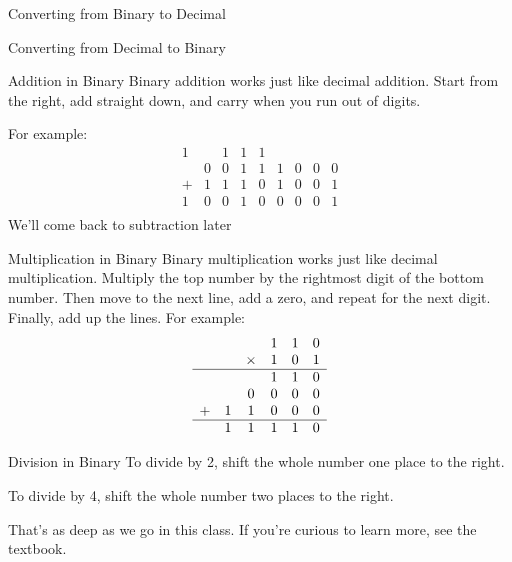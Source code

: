 \begin{frame}{Converting from Binary to Decimal}
\end{frame}

\begin{frame}{Converting from Decimal to Binary}
\end{frame}

\begin{frame}{Addition in Binary}
Binary addition works just like decimal addition. 
Start from the right, add straight down, and carry when you run out of digits.

For example:
\[
\begin{array}{ccccccccc}
    1 &   & 1 & 1 & 1 &   &   &   &   \\ 
      & 0 & 0 & 1 & 1 & 1 & 0 & 0 & 0 \\ 
    + & 1 & 1 & 1 & 0 & 1 & 0 & 0 & 1 \\
    \hline
    1 & 0 & 0 & 1 & 0 & 0 & 0 & 0 & 1 \\ 
\end{array}
\]
We'll come back to subtraction later
\end{frame}

\begin{frame}{Multiplication in Binary}
Binary multiplication works just like decimal multiplication. 
Multiply the top number by the rightmost digit of the bottom number.
Then move to the next line, add a zero, and repeat for the next digit.
Finally, add up the lines. For example:
\[
\begin{array}{cccccc}
        &   &        & 1 & 1 & 0 \\ 
        &   & \times & 1 & 0 & 1 \\
    \hline
        &   &        & 1 & 1 & 0 \\ 
        &   & 0      & 0 & 0 & 0 \\
        + & 1 & 1      & 0 & 0 & 0 \\
        \hline 
        & 1 & 1      & 1 & 1 & 0 \\
\end{array}
\]
\end{frame}


\begin{frame}{Division in Binary}
To divide by 2, shift the whole number one place to the right.

To divide by 4, shift the whole number two places to the right. 

That's as deep as we go in this class. If you're curious to learn more, see the textbook.

\end{frame}

